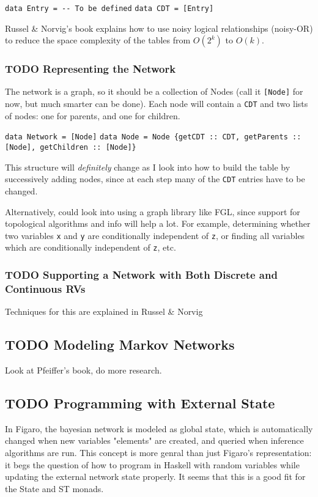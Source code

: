 \documentclass[11pt]{article}
\begin{document}
\begin{center}
\texttt{data Entry = -{}- To be defined}
\texttt{data CDT = [Entry]}
\end{center}

Russel \& Norvig's book explains how to use noisy logical
relationships (noisy-OR) to reduce the space complexity of the tables
from $O(2^k)$ to $O(k)$. 

\subsubsection{{\bfseries\sffamily TODO} Representing the Network}
\label{sec-2-2-2}
The network is a graph, so it should be a collection of Nodes
(call it \texttt{[Node]} for now, but much smarter can be done). Each
node will contain a \texttt{CDT} and two lists of nodes: one for
parents, and one for children.
\begin{center}
\texttt{data Network = [Node]}
\texttt{data Node = Node \{getCDT :: CDT, getParents :: [Node], getChildren :: [Node]\}}
\end{center}

This structure will \emph{definitely} change as I look into how to
build the table by successively adding nodes, since at each step
many of the \texttt{CDT} entries have to be changed. 

Alternatively, could look into using a graph library like FGL,
since support for topological algorithms and info will help a
lot. For example, determining whether two variables \texttt{x} and \texttt{y}
are conditionally independent of \texttt{z}, or finding all variables
which are conditionally independent of \texttt{z}, etc.

\subsubsection{{\bfseries\sffamily TODO} Supporting a Network with Both Discrete and Continuous RVs}
\label{sec-2-2-3}
Techniques for this are explained in Russel \& Norvig

\subsection{{\bfseries\sffamily TODO} Modeling Markov Networks}
\label{sec-2-3}
Look at Pfeiffer's book, do more research.

\subsection{{\bfseries\sffamily TODO} Programming with External State}
\label{sec-2-4}
In Figaro, the bayesian network is modeled as global state, which 
is automatically changed when new variables "elements" are created,
and queried when inference algorithms are run. This concept is more
genral than just Figaro's representation: it begs the question of
how to program in Haskell with random variables while updating
the external network state properly. It seems that this is a good
fit for the State and ST monads.
\end{document}
